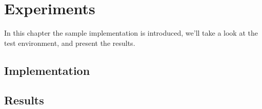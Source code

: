\chapter{Experiments}\label{chp:experiments}

In this chapter the sample implementation is introduced, we'll take a look at the test environment, and present the results.


\section{Implementation}\label{sec:implementation}



\section{Results}

